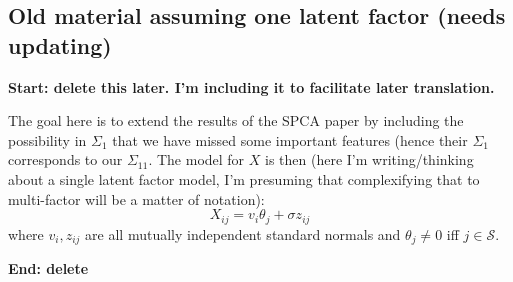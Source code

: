 \documentclass[11pt]{article}
\renewcommand{\S}{\mathcal{S}}
\begin{document}
\subsection{Old material assuming one latent factor (needs updating)}


\textbf{Start: delete this later.  I'm including it to facilitate later translation.}

The goal here is to extend the results of the SPCA paper by including the possibility in $\Sigma_1$ that we have missed some important features  (hence their $\Sigma_1$ corresponds 
to our $\Sigma_{11}$.  The model for $X$ is then (here I'm writing/thinking about a single latent factor model, I'm presuming that complexifying that to multi-factor will be a matter
of notation):
\begin{equation}
X_{ij} = v_i \theta_j + \sigma z_{ij}
\end{equation}
where $v_i,z_{ij}$ are all mutually independent standard normals and $\theta_j \neq 0$ iff $j \in \S$.

\noindent\textbf{End: delete}
\end{document}
